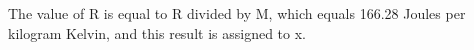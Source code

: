 The value of R is equal to R divided by M, which equals 166.28 Joules per kilogram Kelvin, and this result is assigned to x.
